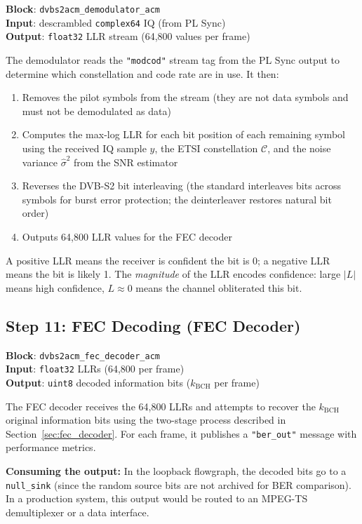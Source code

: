 \documentclass[12pt,a4paper]{report}
\begin{document}
\textbf{Block}: \texttt{dvbs2acm\_demodulator\_acm} \\
\textbf{Input}: descrambled \texttt{complex64} IQ (from PL Sync) \\
\textbf{Output}: \texttt{float32} LLR stream (64,800 values per frame)

The demodulator reads the \texttt{"modcod"} stream tag from the PL Sync output
to determine which constellation and code rate are in use. It then:

\begin{enumerate}
    \item Removes the pilot symbols from the stream (they are not data symbols
          and must not be demodulated as data)
    \item Computes the max-log LLR for each bit position of each remaining
          symbol using the received IQ sample $y$, the ETSI constellation $\mathcal{C}$,
          and the noise variance $\hat{\sigma}^2$ from the SNR estimator
    \item Reverses the DVB-S2 bit interleaving (the standard interleaves bits
          across symbols for burst error protection; the deinterleaver restores
          natural bit order)
    \item Outputs 64,800 LLR values for the FEC decoder
\end{enumerate}

A positive LLR means the receiver is confident the bit is 0; a negative LLR
means the bit is likely 1. The \emph{magnitude} of the LLR encodes confidence:
large $|L|$ means high confidence, $L \approx 0$ means the channel obliterated
this bit.

\subsection{Step 11: FEC Decoding (FEC Decoder)}

\textbf{Block}: \texttt{dvbs2acm\_fec\_decoder\_acm} \\
\textbf{Input}: \texttt{float32} LLRs (64,800 per frame) \\
\textbf{Output}: \texttt{uint8} decoded information bits ($k_\text{BCH}$ per frame)

The FEC decoder receives the 64,800 LLRs and attempts to recover the
$k_\text{BCH}$ original information bits using the two-stage process described
in Section~\ref{sec:fec_decoder}. For each frame, it publishes a
\texttt{"ber\_out"} message with performance metrics.

\textbf{Consuming the output:} In the loopback flowgraph, the decoded bits go
to a \texttt{null\_sink} (since the random source bits are not archived for
BER comparison). In a production system, this output would be routed to an
MPEG-TS demultiplexer or a data interface.
\end{document}
